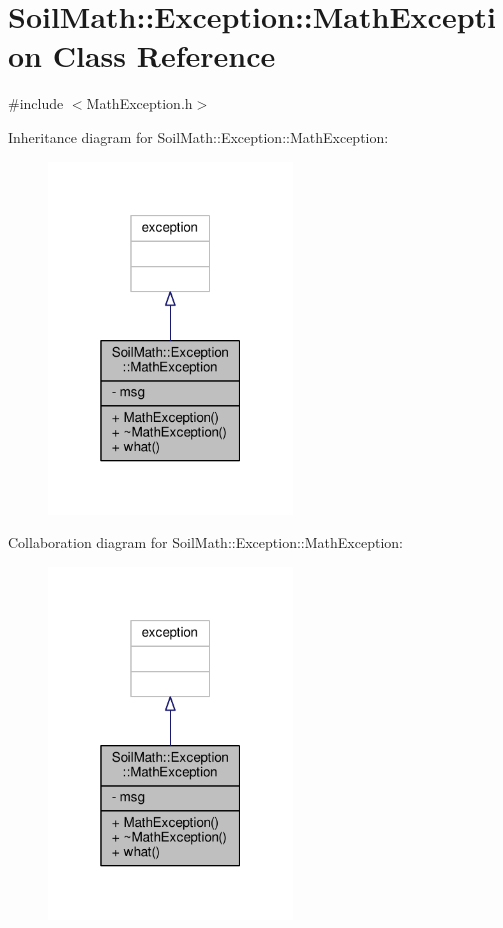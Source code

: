 \hypertarget{class_soil_math_1_1_exception_1_1_math_exception}{}\section{Soil\+Math\+:\+:Exception\+:\+:Math\+Exception Class Reference}
\label{class_soil_math_1_1_exception_1_1_math_exception}


{\ttfamily \#include $<$Math\+Exception.\+h$>$}



Inheritance diagram for Soil\+Math\+:\+:Exception\+:\+:Math\+Exception\+:\nopagebreak
\begin{figure}[H]
\begin{center}
\leavevmode
\includegraphics[width=184pt]{class_soil_math_1_1_exception_1_1_math_exception__inherit__graph}
\end{center}
\end{figure}


Collaboration diagram for Soil\+Math\+:\+:Exception\+:\+:Math\+Exception\+:\nopagebreak
\begin{figure}[H]
\begin{center}
\leavevmode
\includegraphics[width=184pt]{class_soil_math_1_1_exception_1_1_math_exception__coll__graph}
\end{center}
\end{figure}
